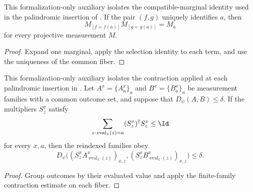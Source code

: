 \begin{lemma}
	\label{lem:sandwich-joint-marginal-product}
	\leanok
	This formalization-only auxiliary isolates the compatible-marginal identity
	used in the palindromic insertion of \cite[Fact~4.34]{Natarajan2018NEEXP}. If the pair
	$(f,g)$ uniquely identifies $a$, then
	\[
		M_{[f=f(a)]}M_{[g=g(a)]}=M_a
	\]
	for every projective measurement $M$.
\end{lemma}
\begin{proof}
	\leanok
	Expand one marginal, apply the selection identity to each term, and use the
	uniqueness of the common fiber.
\end{proof}

\begin{lemma}
	\label{lem:sandwich-fiber-contraction}
	\leanok
	This formalization-only auxiliary isolates the contraction applied at each
	palindromic insertion in \cite[Fact~4.34]{Natarajan2018NEEXP}. Let
	$A^x=\{A^x_a\}_a$ and $B^x=\{B^x_a\}_a$ be measurement families with a
	common outcome set, and suppose that $D_\psi(A,B)\leq\delta$. If the
	multipliers $S_z^x$ satisfy
	\[
		\sum_{z:\,\operatorname{eval}_x(z)=a}(S_z^x)^\dagger S_z^x\leq\Id
	\]
	for every $x,a$, then the reindexed families obey
	\[
		D_\psi\big((S_z^xA^x_{\operatorname{eval}_x(z)})_{x,z},
			(S_z^xB^x_{\operatorname{eval}_x(z)})_{x,z}\big)\leq\delta.
	\]
\end{lemma}
\begin{proof}
	\leanok
	Group outcomes by their evaluated value and apply the finite-family
	contraction estimate on each fiber.
\end{proof}

